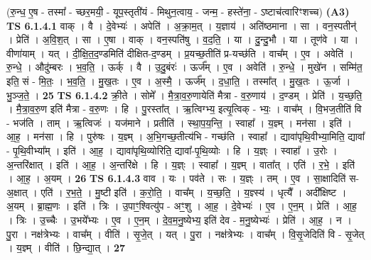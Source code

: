 \documentclass[17pt]{extarticle}
\begin{document}
                  \newline
                      (रु॒न्ध॒ ए॒ष - तस्मा᳚ - च्छर॒मयी॒ - यूप॒स्तृती॑यं - मिथुन॒त्वाय॒ - जन्म॒ - हस्ते॑ना॒ - ऽष्टाच॑त्वारिꣳशच्च)  \textbf{(A3)} \newline \newline
                                \textbf{ TS 6.1.4.1} \newline
                  वाक् । वै । दे॒वेभ्यः॑ । अपेति॑ । अ॒क्रा॒म॒त् । य॒ज्ञाय॑ । अति॑ष्ठमाना । सा । वन॒स्पतीन्॑ । प्रेति॑ । अ॒वि॒श॒त् । सा । ए॒षा । वाक् । वन॒स्पति॑षु । व॒द॒ति॒ । या । दु॒न्दु॒भौ । या । तूण॑वे । या । वीणा॑याम् । यत् । दी॒क्षि॒त॒द॒ण्डमिति॑ दीक्षित-द॒ण्डम् । प्र॒यच्छ॒तीति॑ प्र-यच्छ॑ति । वाच᳚म् । ए॒व । अवेति॑ । रु॒न्धे॒ । औदु॑म्बरः । भ॒व॒ति॒ । ऊर्क् । वै । उ॒दु॒बंरः॑ । ऊर्ज᳚म् । ए॒व । अवेति॑ । रु॒न्धे॒ । मुखे॑न । सम्मि॑त॒ इति॒ सं - मि॒तः॒ । भ॒व॒ति॒ । मु॒ख॒तः । ए॒व । अ॒स्मै॒ । ऊर्ज᳚म् । द॒धा॒ति॒ । तस्मा᳚त् । मु॒ख॒तः । ऊ॒र्जा । भु॒ञ्ज॒ते॒ । \textbf{  25} \newline
                  \newline
                                \textbf{ TS 6.1.4.2} \newline
                  क्री॒ते । सोमे᳚ । मै॒त्रा॒व॒रु॒णायेति॑ मैत्रा - व॒रु॒णाय॑ । द॒ण्डम् । प्रेति॑ । य॒च्छ॒ति॒ । मै॒त्रा॒व॒रु॒ण इति॑ मैत्रा - व॒रु॒णः । हि । पु॒रस्ता᳚त् । ऋ॒त्विग्भ्य॒ इत्यृ॒त्विक् - भ्यः॒ । वाच᳚म् । वि॒भज॒तीति॑ वि - भज॑ति । ताम् । ऋ॒त्विजः॑ । यज॑माने । प्रतीति॑ । स्था॒प॒य॒न्ति॒ । स्वाहा᳚ । य॒ज्ञ्म् । मन॑सा । इति॑ । आ॒ह॒ । मन॑सा । हि । पुरु॑षः । य॒ज्ञ्म् । अ॒भि॒गच्छ॒तीत्य॑भि - गच्छ॑ति । स्वाहा᳚ । द्यावा॑पृथि॒वीभ्या॒मिति॒ द्यावा᳚ - पृ॒थि॒वीभ्या᳚म् । इति॑ । आ॒ह॒ । द्यावा॑पृथि॒व्योरिति॒ द्यावा᳚-पृ॒थि॒व्योः । हि । य॒ज्ञ्ः । स्वाहा᳚ । उ॒रोः । अ॒न्तरि॑क्षात् । इति॑ । आ॒ह॒ । अ॒न्तरि॑क्षे । हि । य॒ज्ञ्ः । स्वाहा᳚ । य॒ज्ञ्म् । वाता᳚त् । एति॑ । र॒भे॒ । इति॑ । आ॒ह॒ । अ॒यम् । \textbf{  26} \newline
                  \newline
                                \textbf{ TS 6.1.4.3} \newline
                  वाव । यः । पव॑ते । सः । य॒ज्ञ्ः । तम् । ए॒व । सा॒क्षादिति॑ स-अ॒क्षात् । एति॑ । र॒भ॒ते॒ । मु॒ष्टी इति॑ । क॒रो॒ति॒ । वाच᳚म् । य॒च्छ॒ति॒ । य॒ज्ञ्स्य॑ । धृत्यै᳚ । अदी᳚क्षिष्ट । अ॒यम् । ब्रा॒ह्म॒णः । इति॑ । त्रिः । उ॒पाꣳ॒॒श्वित्यु॑प - अꣳ॒॒शु । आ॒ह॒ । दे॒वेभ्यः॑ । ए॒व । ए॒न॒म् । प्रेति॑ । आ॒ह॒ । त्रिः । उ॒च्चैः । उ॒भये᳚भ्यः । ए॒व । ए॒न॒म् । दे॒व॒म॒नु॒ष्येभ्य॒ इति॑ देव - म॒नु॒ष्येभ्यः॑ । प्रेति॑ । आ॒ह॒ । न । पु॒रा । नक्ष॑त्रेभ्यः । वाच᳚म् । वीति॑ । सृ॒जे॒त् । यत् । पु॒रा । नक्ष॑त्रेभ्यः । वाच᳚म् । वि॒सृ॒जेदिति॑ वि - सृ॒जेत् । य॒ज्ञ्म् । वीति॑ । छि॒न्द्या॒त् । \textbf{  27} \newline
\end{document}
